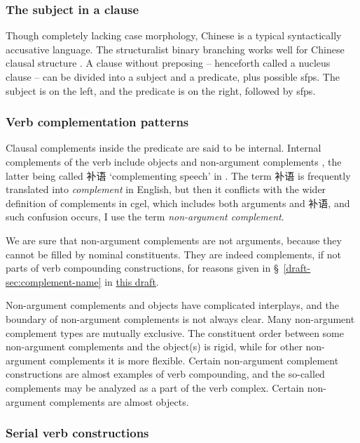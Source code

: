 \documentclass[UTF8, a4paper, oneside, scheme=plain]{ctexart}
\newcommand*{\citesec}[1]{\S~{#1}}
\newcommand*{\term}[1]{\emph{#1}}
\newcommand{\draft}{\href{./main.pdf}{this draft}}
\newcommand{\translate}[1]{`#1'}
\begin{document}
\subsubsection{The subject in a clause}

Though completely lacking case morphology,
Chinese is a typical syntactically accusative language.
The structuralist binary branching works well for Chinese clausal structure 
\citep[\citesec{133-136}]{zhudexigrammar}.
A clause without preposing -- henceforth called a nucleus clause --
can be divided into a subject and a predicate,
plus possible \ac{sfp}s.
The subject is on the left, and the predicate is on the right, followed by \ac{sfp}s.

\subsubsection{Verb complementation patterns}

Clausal complements inside the predicate are said to be internal.
Internal complements of the verb include objects and non-argument complements
\citep[1.3.3-1.3.4]{zhudexigrammar},
the latter being called 补语 \translate{complementing speech} in \citet{zhudexigrammar}.
The term 补语 is frequently translated into \term{complement} in English,
but then it conflicts with the wider definition of complements in \ac{cgel},
which includes both arguments and 补语,
and such confusion occurs,
I use the term \term{non-argument complement}.

We are sure that non-argument complements are not arguments,
because they cannot be filled by nominal constituents.
They are indeed complements, if not parts of verb compounding constructions,
for reasons given in \citesec{\ref{draft-sec:complement-name}} in \draft.

Non-argument complements and objects have complicated interplays,
and the boundary of non-argument complements is not always clear.
Many non-argument complement types are mutually exclusive.
The constituent order between some non-argument complements and the object(s) is rigid,
while for other non-argument complements it is more flexible.
Certain non-argument complement constructions are almost examples of verb compounding,
and the so-called complements may be analyzed as a part of the verb complex.
Certain non-argument complements are almost objects.

\subsubsection{Serial verb constructions}\label{sec:serial-verb-construction-intro}
\end{document}
